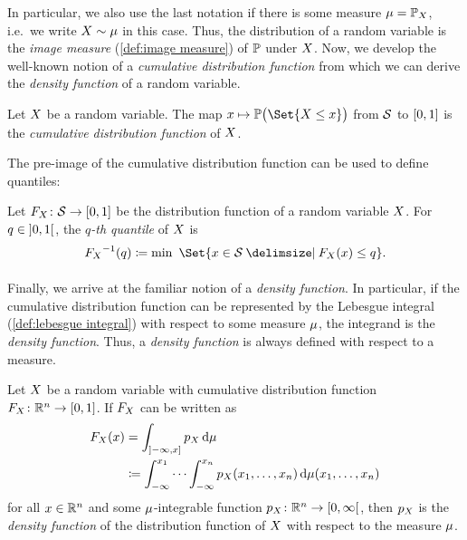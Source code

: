 In particular, we also use the last notation if there is some measure \( \mu = \mathbb{P}_X \), i.e.\ we write \( X \sim \mu \) in this case.
Thus, the distribution of a random variable is the \emph{image measure} (\cref{def:image measure}) of \( \mathbb{P} \) under \( X \).
Now, we develop the well-known notion of a \emph{cumulative distribution function} from which we can derive the \emph{density function} of a random variable.
\begin{definition}%
	\label{def:cumulative distribution function}
	Let \( X \) be a random variable.
	The map \( x \mapsto \ProbabilityMeasure\bigl( \Set{X \leq x} \bigr) \) from \( \mathcal{S} \) to \( \interval{\num{0}}{\num{1}} \) is the \emph{cumulative distribution function} of \( X \).
\end{definition}
The pre-image of the cumulative distribution function can be used to define quantiles:
\begin{definition}[Quantile]%
	\label{def:quantile}
	Let \( \map{\DistributionFunction_\RandomVariable}{\ASet}{\interval{\num{0}}{\num{1}}} \) be the distribution function of a random variable \( X \).
	For \( q \in \ointerval{\num{0}}{\num{1}} \), the \emph{\( q \)-th quantile} of \( X \) is
	\begin{equation}
		\PreImage{\DistributionFunction_\RandomVariable}(q) \coloneqq \min_{}\ \Set{x \in \ASet \given \DistributionFunction_\RandomVariable(x) \leq q}.
	\end{equation}
\end{definition}
Finally, we arrive at the familiar notion of a \emph{density function}.
In particular, if the cumulative distribution function can be represented by the Lebesgue integral (\cref{def:lebesgue integral}) with respect to some measure \( \mu \), the integrand is the \emph{density function}.
Thus, a \emph{density function} is always defined with respect to a measure.
\begin{definition}%
	\label{def:density function}
	Let \( X \) be a random variable with cumulative distribution function \( \map{\DistributionFunctionX}{\R^n}{\interval{\num{0}}{\num{1}}} \).
	If \( F_X \) can be written as
	\begin{equation}
		\begin{aligned}
			\DistributionFunctionX(x) &= \int_{\linterval{-\infty}{x}} \DensityFunctionX\,\mathrm{d}\Measure \\
									  &\coloneqq \int_{-\infty}^{x_{\num{1}}} \cdots \int_{-\infty}^{x_n} \DensityFunctionX(x_{\num{1}},\dotsc,x_n)\,\mathrm{d}\Measure(x_{\num{1}},\dotsc,x_n)
		\end{aligned}
	\end{equation}
	for all \( x \in \mathbb{R}^n \) and some \( \mu \)-integrable function \( \map{\DensityFunctionX}{\R^n}{\rinterval{\num{0}}{\infty}} \), then \( p_X \) is the \emph{density function} of the distribution function of \( X \) with respect to the measure \( \mu \).
\end{definition}

